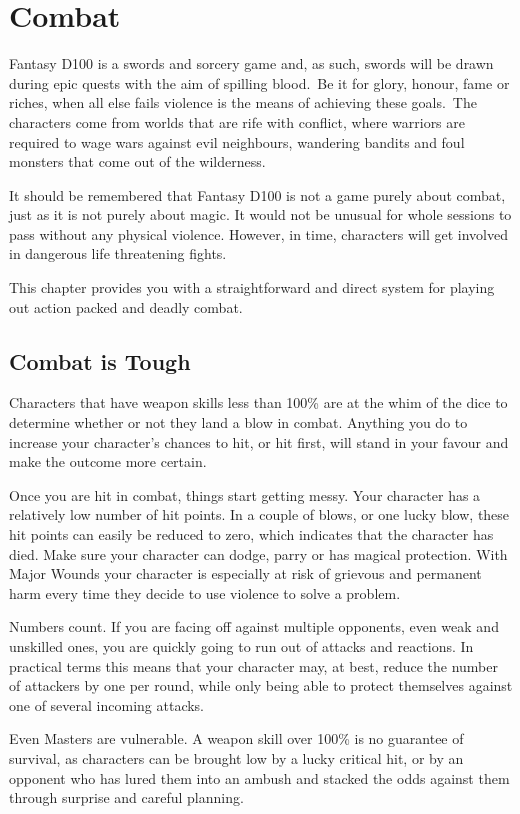 \chapter{Combat}
\label{ch:combat}

Fantasy D100 is a swords and sorcery game and, as such, swords will be drawn during epic quests with the aim of spilling blood. Be it for glory, honour, fame or riches, when all else fails violence is the means of achieving these goals. The characters come from worlds that are rife with conflict, where warriors are required to wage wars against evil neighbours, wandering bandits and foul monsters that come out of the wilderness.  

It should be remembered that Fantasy D100 is not a game purely about combat, just as it is not purely about magic. It would not be unusual for whole sessions to pass without any physical violence. However, in time, characters will get involved in dangerous life threatening fights. 

This chapter provides you with a straightforward and direct system for playing out action packed and deadly combat.

\section{Combat is Tough}
Characters that have weapon skills less than 100\% are at the whim of the dice to determine whether or not they land a blow in combat. Anything you do to increase your character’s chances to hit, or hit first, will stand in your favour and make the outcome more certain.

Once you are hit in combat, things start getting messy. Your character has a relatively low number of hit points. In a couple of blows, or one lucky blow, these hit points can easily be reduced to zero, which indicates that the character has died. Make sure your character can dodge, parry or has magical protection. With Major Wounds your character is especially at risk of grievous and permanent harm every time they decide to use violence to solve a problem.

Numbers count. If you are facing off against multiple opponents, even weak and unskilled ones, you are quickly going to run out of attacks and reactions. In practical terms this means that your character may, at best, reduce the number of attackers by one per round, while only being able to protect themselves against one of several incoming attacks. 

Even Masters are vulnerable. A weapon skill over 100\% is no guarantee of survival, as characters can be brought low by a lucky critical hit, or by an opponent who has lured them into an ambush and stacked the odds against them through surprise and careful planning. 

